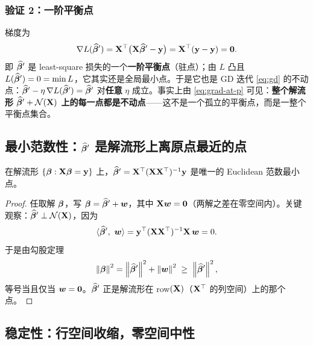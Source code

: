 \subsubsection*{验证 2：一阶平衡点}
梯度为
\begin{equation}\label{eq:grad-at-p}
  \nabla L(\widehat{\bm{\beta}}') = \mathbf{X}^\top \big( \mathbf{X} \widehat{\bm{\beta}}' - \mathbf{y} \big) = \mathbf{X}^\top ( \mathbf{y} - \mathbf{y} ) = \mathbf{0} .
\end{equation}
即 $\widehat{\bm{\beta}}'$ 是 least-square 损失的一个\textbf{一阶平衡点}（驻点）；由 $L$ 凸且 $L(\widehat{\bm{\beta}}') = 0 = \min L$，它其实还是全局最小点。于是它也是 GD 迭代 \eqref{eq:gd} 的不动点：$\widehat{\bm{\beta}}' - \eta\, \nabla L(\widehat{\bm{\beta}}') = \widehat{\bm{\beta}}'$ 对\textbf{任意} $\eta$ 成立。事实上由 \eqref{eq:grad-at-p} 可见：\textbf{整个解流形 $\widehat{\bm{\beta}}' + \mathcal{N}(\mathbf{X})$ 上的每一点都是不动点}——这不是一个孤立的平衡点，而是一整个平衡点集合。

\subsection[最小范数性：解流形上离原点最近的点]{最小范数性：$\widehat{\bm{\beta}}'$ 是解流形上离原点最近的点}\label{sec:minnorm}

\begin{theorem}[最小范数解]\label{thm:minnorm}
在解流形 $\{ \bm{\beta} : \mathbf{X} \bm{\beta} = \mathbf{y} \}$ 上，$\widehat{\bm{\beta}}' = \mathbf{X}^\top(\mathbf{X}\mathbf{X}^\top)^{-1}\mathbf{y}$ 是唯一的 Euclidean 范数最小点。
\end{theorem}
\begin{proof}
任取解 $\bm{\beta}$，写 $\bm{\beta} = \widehat{\bm{\beta}}' + \bm{w}$，其中 $\mathbf{X}\bm{w} = \mathbf{0}$（两解之差在零空间内）。关键观察：$\widehat{\bm{\beta}}' \perp \mathcal{N}(\mathbf{X})$，因为
\[
  \langle \widehat{\bm{\beta}}',\ \bm{w} \rangle = \mathbf{y}^\top (\mathbf{X}\mathbf{X}^\top)^{-1} \mathbf{X}\, \bm{w} = 0 .
\]
于是由勾股定理
\[
  \left\lVert \bm{\beta} \right\rVert^2 = \left\lVert \widehat{\bm{\beta}}' \right\rVert^2 + \left\lVert \bm{w} \right\rVert^2 \;\ge\; \left\lVert \widehat{\bm{\beta}}' \right\rVert^2,
\]
等号当且仅当 $\bm{w} = \mathbf{0}$。$\widehat{\bm{\beta}}'$ 正是解流形在 row$(\mathbf{X})$（$\mathbf{X}^\top$ 的列空间）上的那个点。
\end{proof}

\subsection{稳定性：行空间收缩，零空间中性}\label{sec:stability}

